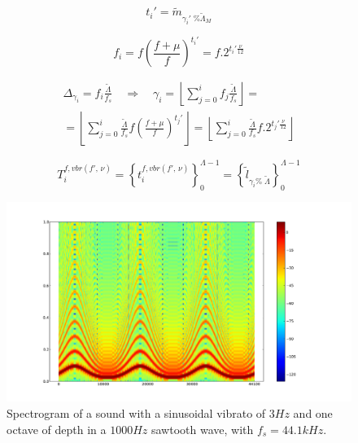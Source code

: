 \begin{equation}\label{vbrAux}
 t_i'=\widetilde{m}_{\gamma_i' \;\% \widetilde{\Lambda}_M}
\end{equation}

\begin{equation}\label{vbrF}
 f_i=f \left ( \frac{f + \mu }{f} \right )^{t_i'}=f . 2^{t_i'\frac{\nu}{12}}
\end{equation}

\begin{multline}\label{vbrGamma2}
 \Delta_{\gamma_i}=f_i\frac{\widetilde{\Lambda}}{f_s} \quad \Rightarrow \quad \gamma_i = \left \lfloor \sum_{j=0}^{i} f_j \frac{\widetilde{\Lambda}}{f_s} \right \rfloor = \\ = \left \lfloor \sum_{j=0}^{i} \frac{\widetilde{\Lambda}}{f_s}f \left ( \frac{f + \mu }{f} \right )^{t_j'}  \right \rfloor= \left \lfloor \sum_{j=0}^{i} \frac{\widetilde{\Lambda}}{f_s}f . 2^{t_j'\frac{\nu}{12}}  \right \rfloor
\end{multline}

\begin{equation}\label{vbrT}
 T_i^{f, vbr(f',\,\nu)}=\left\{ t_i^{f,vbr(f',\,\nu)} \right\}_0^{\Lambda-1}=\left\{ \widetilde{l}_{\gamma_i \%\; \widetilde{\Lambda} } \right\}_0^{\Lambda-1}
\end{equation}

\begin{figure}[h!]
     \centering
         \includegraphics[width=\columnwidth]{figures/vibrato}
     \caption{Spectrogram of a sound with a sinusoidal vibrato of $3Hz$ and one octave of depth in a $1000Hz$ sawtooth wave, with $f_s=44.1kHz$.}
         \label{fig:vibrato}
\end{figure}

